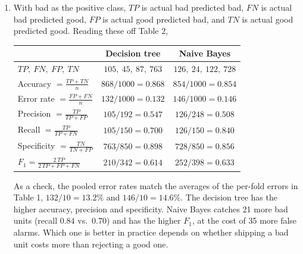 \documentclass[12pt,letterpaper, onecolumn]{exam}
\begin{document}
\begin{questions}
\begin{solution}
\begin{enumerate}[1.]
            \item With bad as the positive class, $TP$ is actual bad predicted bad, $FN$ is actual bad predicted good, $FP$ is actual good predicted bad, and $TN$ is actual good predicted good. Reading these off Table 2,
            \begin{center}
                {\small
                \begin{tabular}{|l|c|c|}
                    \hline & Decision tree & Naive Bayes \\ \hline
                    $TP,\ FN,\ FP,\ TN$ & $105,\ 45,\ 87,\ 763$ & $126,\ 24,\ 122,\ 728$ \\ \hline
                    Accuracy $=\frac{TP+TN}{n}$ & $868/1000 = 0.868$ & $854/1000 = 0.854$ \\
                    Error rate $=\frac{FP+FN}{n}$ & $132/1000 = 0.132$ & $146/1000 = 0.146$ \\
                    Precision $=\frac{TP}{TP+FP}$ & $105/192 = 0.547$ & $126/248 = 0.508$ \\
                    Recall $=\frac{TP}{TP+FN}$ & $105/150 = 0.700$ & $126/150 = 0.840$ \\
                    Specificity $=\frac{TN}{TN+FP}$ & $763/850 = 0.898$ & $728/850 = 0.856$ \\
                    $F_1 = \frac{2\,TP}{2\,TP+FP+FN}$ & $210/342 = 0.614$ & $252/398 = 0.633$ \\ \hline
                \end{tabular}
                }
            \end{center}
            As a check, the pooled error rates match the averages of the per-fold errors in Table 1, $132/10 = 13.2\%$ and $146/10 = 14.6\%$. The decision tree has the higher accuracy, precision and specificity. Naive Bayes catches 21 more bad units (recall $0.84$ vs.\ $0.70$) and has the higher $F_1$, at the cost of 35 more false alarms. Which one is better in practice depends on whether shipping a bad unit costs more than rejecting a good one.


\end{enumerate}
\end{solution}
\end{questions}
\end{document}

